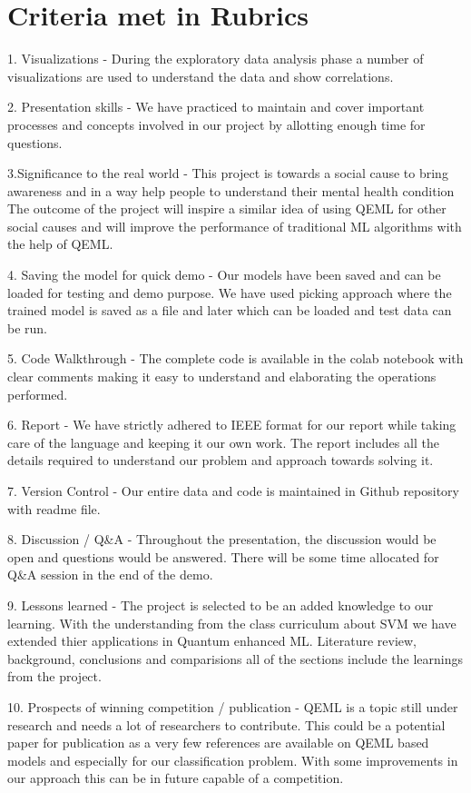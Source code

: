 \documentclass[10pt,journal,compsoc]{IEEEtran}
\begin{document}
\appendices
\section{Criteria met in Rubrics}
1. Visualizations - During the exploratory data analysis phase a number of visualizations are used to understand the data and show correlations.

2. Presentation skills - We have practiced to maintain and cover important processes and concepts involved in our project by allotting enough time for questions.

3.Significance to the real world - This project is towards a social cause to bring awareness and in a way help people to understand their mental health condition The outcome of the project will inspire a similar idea of using QEML for other social causes and will improve the performance of traditional ML algorithms with the help of QEML. 

4. Saving the model for quick demo - Our models have been saved and can be loaded for testing and demo purpose. We have used picking approach where the trained model is saved as a file and later which can be loaded and test data can be run.

5. Code Walkthrough - The complete code is available in the colab notebook with clear comments making it easy to understand and elaborating the operations performed.

6. Report - We have strictly adhered to IEEE format for our report while taking care of the language and keeping it our own work. The report includes all the details required to understand our problem and approach towards solving it.

7. Version Control - Our entire data and code is maintained in Github repository with readme file.

8. Discussion / Q&A - Throughout the presentation, the discussion would be open and questions would be answered. There will be some time allocated for Q&A session in the end of the demo.

9. Lessons learned - The project is selected to be an added knowledge to our learning. With the understanding from the class curriculum about SVM we have extended thier applications in Quantum enhanced ML. Literature review, background, conclusions and comparisions all of the sections include the learnings from the project.

10. Prospects of winning competition / publication - QEML is a topic still under research and needs a lot of researchers to contribute. This could be a potential paper for publication as a very few references are available on QEML based models and especially for our classification problem. With some improvements in our approach this can be in future capable of a competition.
\end{document}
